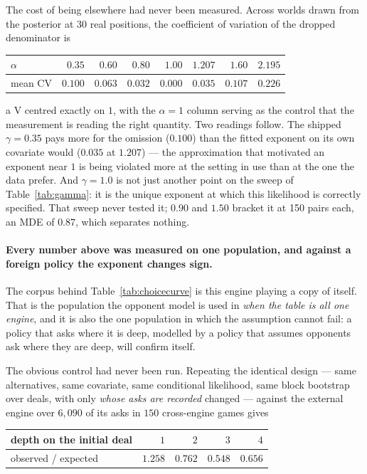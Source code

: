 \documentclass[11pt,letterpaper]{article}
\begin{document}
The cost of being elsewhere had never been measured. Across worlds drawn from
the posterior at 30 real positions, the coefficient of variation of the dropped
denominator is

\begin{center}
\small
\begin{tabular}{lrrrrrrr}
\toprule
$\alpha$ & $0.35$ & $0.60$ & $0.80$ & $1.00$ & $1.207$ & $1.60$ & $2.195$ \\
\midrule
mean CV & $0.100$ & $0.063$ & $0.032$ & $\mathbf{0.000}$ & $0.035$ & $0.107$ & $0.226$ \\
\bottomrule
\end{tabular}
\end{center}

a V centred exactly on $1$, with the $\alpha = 1$ column serving as the control
that the measurement is reading the right quantity. Two readings follow. The
shipped $\gamma = 0.35$ pays more for the omission ($0.100$) than the fitted
exponent on its own covariate would ($0.035$ at $1.207$) --- the approximation
that motivated an exponent near $1$ is being violated more at the setting in use
than at the one the data prefer. And $\gamma = 1.0$ is not just another point on
the sweep of Table~\ref{tab:gamma}: it is the unique exponent at which this
likelihood is correctly specified. That sweep never tested it; $0.90$ and $1.50$
bracket it at 150 pairs each, an MDE of $0.87$, which separates nothing.

\paragraph{Every number above was measured on one population, and against a
foreign policy the exponent changes sign.} The corpus behind
Table~\ref{tab:choicecurve} is this engine playing a copy of itself. That is
the population the opponent model is used in \emph{when the table is all one
engine}, and it is also the one population in which the assumption cannot
fail: a policy that asks where it is deep, modelled by a policy that assumes
opponents ask where they are deep, will confirm itself.

The obvious control had never been run. Repeating the identical design ---
same alternatives, same covariate, same conditional likelihood, same block
bootstrap over deals, with only \emph{whose asks are recorded} changed ---
against the external engine over $6{,}090$ of its asks in $150$ cross-engine games gives

\begin{center}
\small
\begin{tabular}{lrrrr}
\toprule
depth on the initial deal & $1$ & $2$ & $3$ & $4$ \\
\midrule
observed / expected & $1.258$ & $0.762$ & $0.548$ & $0.656$ \\
\bottomrule
\end{tabular}
\end{center}
\end{document}
